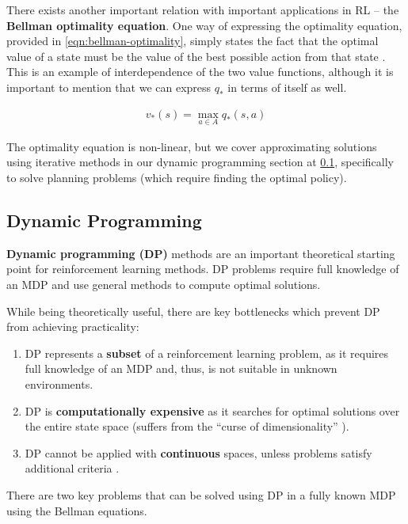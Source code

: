 There exists another important relation with important applications in RL -- the \textbf{Bellman optimality equation}.
One way of expressing the optimality equation, provided in \ref{eqn:bellman-optimality}, simply states the fact that the optimal value of a state must be the value of the best possible action from that state \cite{rlai}.
This is an example of interdependence of the two value functions, although it is important to mention that we can express $q_{*}$ in terms of itself as well.

\begin{equation} \label{eqn:bellman-optimality}
    \begin{aligned}
        v_*(s) = \max_{a \in A} q_{*}(s, a)
    \end{aligned}
\end{equation}

The optimality equation is non-linear, but we cover approximating solutions using iterative methods in our dynamic programming section at \ref{rl:dp}, specifically to solve planning problems (which require finding the optimal policy).

\subsection{Dynamic Programming} \label{rl:dp}
\textbf{Dynamic programming (DP)} methods are an important theoretical starting point for reinforcement learning methods. DP problems require full knowledge of an MDP and use general methods to compute optimal solutions.

While being theoretically useful, there are key bottlenecks which prevent DP from achieving practicality:

\begin{enumerate}
    \item DP represents a \textbf{subset} of a reinforcement learning problem, as it requires full knowledge of an MDP and, thus, is not suitable in unknown environments.
    \item DP is \textbf{computationally expensive} as it searches for optimal solutions over the entire state space (suffers from the ``curse of dimensionality'' \cite{rlai}).
    \item DP cannot be applied with \textbf{continuous} spaces, unless problems satisfy additional criteria \cite{rlai}.
\end{enumerate}

There are two key problems that can be solved using DP in a fully known MDP using the Bellman equations.

